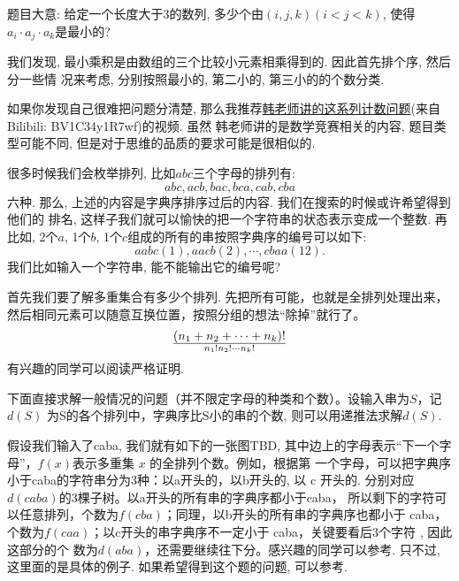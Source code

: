 题目大意: 给定一个长度大于3的数列, 多少个由$(i,j,k)(i < j < k) $, 使得$a_i\cdot a_j\cdot a_k$是最小的? 

我们发现, 最小乘积是由数组的三个比较小元素相乘得到的. 因此首先排个序, 然后分一些情
况来考虑, 分别按照最小的, 第二小的, 第三小的的个数分类. 

如果你发现自己很难把问题分清楚, 那么我推荐\href{https://www.bilibili.com/video/BV1C34y1R7wf}{韩老师讲的这系列计数问题}(来自Bilibili: BV1C34y1R7wf)的视频. 虽然
韩老师讲的是数学竞赛相关的内容, 题目类型可能不同, 但是对于思维的品质的要求可能是很相似的. 

 很多时候我们会枚举排列, 比如$abc$三个字母的排列有: 
$$
abc, acb, bac, bca, cab, cba
$$
六种. 那么, 上述的内容是字典序排序过后的内容. 我们在搜索的时候或许希望得到他们的
排名, 这样子我们就可以愉快的把一个字符串的状态表示变成一个整数. 再比如, 2个$a$, 
1个$b$, 1个$c$组成的所有的串按照字典序的编号可以如下: 
$$
aabc(1), aacb(2), \cdots, cbaa(12).
$$
我们比如输入一个字符串, 能不能输出它的编号呢? 

首先我们要了解多重集合有多少个排列. 先把所有可能，也就是全排列处理出来，
然后相同元素可以随意互换位置，按照分组的想法``除掉''就行了。
$$
(n_1+n_2+\cdots+n_k)!\over n_1!n_2!\cdots n_k!
$$
有兴趣的同学可以阅读严格证明. 

下面直接求解一般情况的问题（并不限定字母的种类和个数）。设输入串为$S$，记$d(S)$
为S的各个排列中，字典序比S小的串的个数, 则可以用递推法求解$d(S)$.

假设我们输入了caba, 我们就有如下的一张图TBD, 
其中边上的字母表示“下一个字母”，$f(x)$表示多重集 $x$ 的全排列个数。例如，根据第
一个字母，可以把字典序小于caba的字符串分为3种：以a开头的，以b开头的, 以 c 开头的.
分别对应$d(caba)$的3棵子树。以a开头的所有串的字典序都小于caba，
所以剩下的字符可以任意排列，个数为$f(cba)$；同理，以b开头的所有串的字典序也都小于 caba，
个数为$f(caa)$；以c开头的串字典序不一定小于 caba，关键要看后3个字符 , 因此这部分的个
数为$d(aba)$，还需要继续往下分。感兴趣的同学可以参考. 
只不过, 这里面的是具体的例子. 如果希望得到这个题的问题, 可以参考. 
